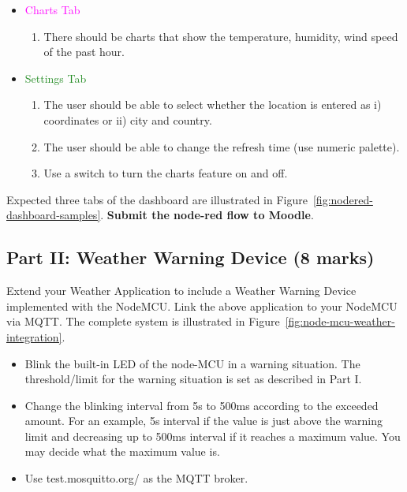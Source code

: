 \documentclass[11pt,letterpaper]{article}
\begin{document}
\begin{itemize}
    \item \textcolor{magenta}{Charts Tab} 
    
    \begin{enumerate}
        \item There should be charts that show the temperature, humidity, wind speed of the past hour.
    \end{enumerate}
    
    \item \textcolor{ForestGreen}{Settings Tab} 
    
    \begin{enumerate}
       
        \item The user should be able to select whether the location is entered as i) coordinates or ii) city and country.
    
        
        \item  The user should be able to change the refresh time (use numeric palette).
    
        \item Use a switch to turn the charts feature on and off.
    
    \end{enumerate}
    

\end{itemize}

\noindent Expected three tabs of the dashboard are illustrated in Figure~\ref{fig:nodered-dashboard-samples}. \textbf{Submit the node-red flow to Moodle}. 

\subsection*{Part II: Weather Warning Device (8 marks)}

Extend your Weather Application to include a Weather Warning Device implemented with the NodeMCU. Link the above application to your NodeMCU via MQTT. The complete system is illustrated in Figure~\ref{fig:node-mcu-weather-integration}.

\begin{itemize}
    \item Blink the built-in LED of the node-MCU in a warning situation. The threshold/limit for the warning situation is set as described in Part I.
    \item Change the blinking interval from 5s to 500ms according to the exceeded amount. For an example, 5s interval if the value is just above the warning limit and decreasing up to 500ms interval if it reaches a maximum value. You may decide what the maximum value is.
    \item Use test.mosquitto.org/ as the MQTT broker.
\end{itemize}
\end{document}
